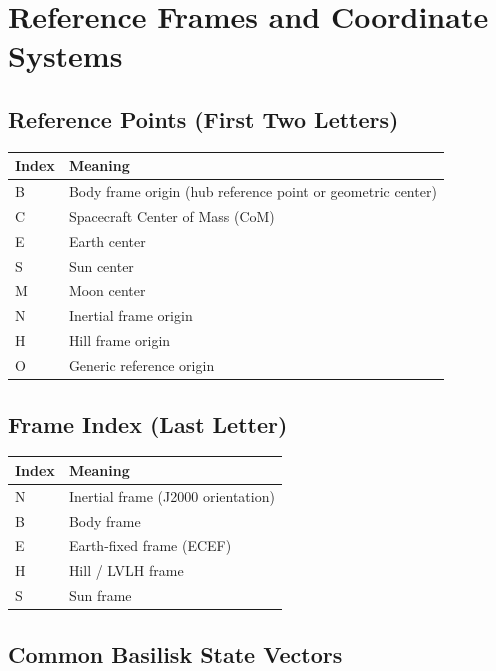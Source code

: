 \chapter{Reference Frames and Coordinate Systems}

\section*{Reference Points (First Two Letters)}

\begin{tabular}{ll}
	\toprule
	Index & Meaning \\
	\midrule
	B & Body frame origin (hub reference point or geometric center) \\
	C & Spacecraft Center of Mass (CoM) \\
	E & Earth center \\
	S & Sun center \\
	M & Moon center \\
	N & Inertial frame origin \\
	H & Hill frame origin \\
	O & Generic reference origin \\
	\bottomrule
\end{tabular}

\section*{Frame Index (Last Letter)}

\begin{tabular}{ll}
	\toprule
	Index & Meaning \\
	\midrule
	N & Inertial frame (J2000 orientation) \\
	B & Body frame \\
	E & Earth-fixed frame (ECEF) \\
	H & Hill / LVLH frame \\
	S & Sun frame \\
	\bottomrule
\end{tabular}

\section*{Common Basilisk State Vectors}

